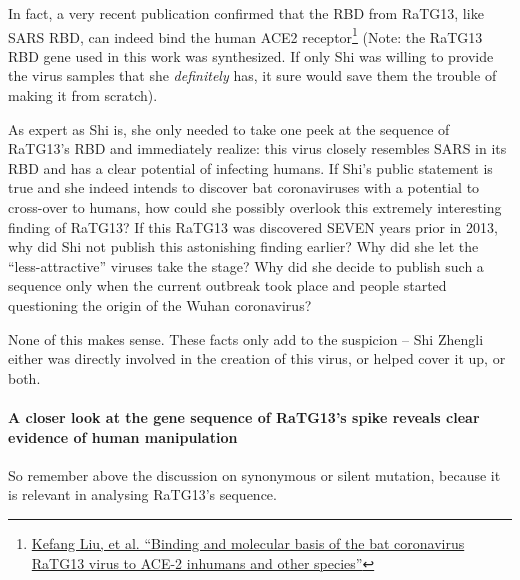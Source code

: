 \documentclass[11pt]{article}
\begin{document}
In fact, a very recent publication confirmed that the RBD from RaTG13, like SARS RBD, can indeed bind the human ACE2 receptor\footnote{\href{https://www.cell.com/cell/pdf/S0092-8674(21)00661-9.pdf?\_returnURL=https\%3A\%2F\%2Flinkinghub.elsevier.com\%2Fretrieve\%2Fpii\%2FS0092867421006619\%3Fshowall\%3Dtrue}{Kefang Liu, et al. ``Binding and molecular basis of the bat coronavirus RaTG13 virus to ACE-2 inhumans and other species''}} (Note: the RaTG13 RBD gene used in this work was synthesized. If only Shi was willing to provide the virus samples that she \emph{definitely} has, it sure would save them the trouble of making it from scratch).

As expert as Shi is, she only needed to take one peek at the sequence of RaTG13’s RBD and immediately realize: this virus closely resembles SARS in its RBD and has a clear potential of infecting humans. If Shi’s public statement is true and she indeed intends to discover bat coronaviruses with a potential to cross-over to humans, how could she possibly overlook this extremely interesting finding of RaTG13? If this RaTG13 was discovered SEVEN years prior in 2013, why did Shi not publish this astonishing finding earlier? Why did she let the “less-attractive” viruses take the stage? Why did she decide to publish such a sequence only when the current outbreak took place and people started questioning the origin of the Wuhan coronavirus?

None of this makes sense. These facts only add to the suspicion – Shi Zhengli either was directly involved in the creation of this virus, or helped cover it up, or both.

\paragraph{A closer look at the gene sequence of RaTG13’s spike reveals clear evidence of human manipulation}
\label{sec:org8978ec5}
So remember above the discussion on synonymous or silent mutation, because it is relevant in analysing RaTG13's sequence.
\end{document}
